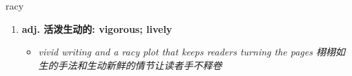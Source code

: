 
\begin{frame}
{\huge racy}
\begin{center}
\begin{enumerate}\Large
  \item \textbf{adj. 活泼生动的: vigorous; lively}
  \begin{itemize}
    \item \em{\Large{vivid writing and a racy plot that keeps readers turning the pages 栩栩如生的手法和生动新鲜的情节让读者手不释卷}}
  \end{itemize}
\end{enumerate}
\end{center}
\end{frame}
